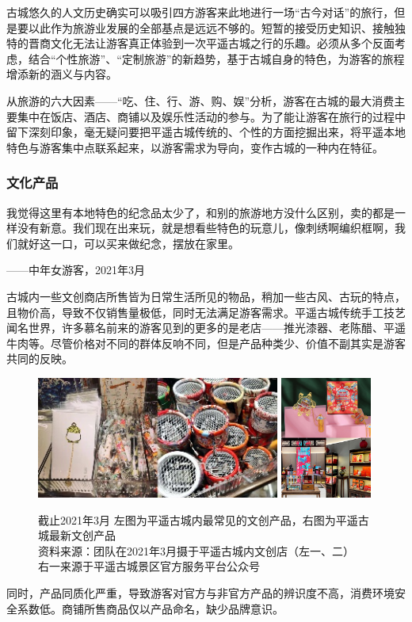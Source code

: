 \documentclass[UTF8]{ctexart}
\begin{document}
        古城悠久的人文历史确实可以吸引四方游客来此地进行一场“古今对话”的旅行，但是要以此作为旅游业发展的全部基点是远远不够的。短暂的接受历史知识、接触独特的晋商文化无法让游客真正体验到一次平遥古城之行的乐趣。必须从多个反面考虑，结合“个性旅游”、“定制旅游”的新趋势，基于古城自身的特色，为游客的旅程增添新的涵义与内容。

        从旅游的六大因素——“吃、住、行、游、购、娱”分析，游客在古城的最大消费主要集中在饭店、酒店、商铺以及娱乐性活动的参与。为了能让游客在旅行的过程中留下深刻印象，毫无疑问要把平遥古城传统的、个性的方面挖掘出来，将平遥本地特色与游客集中点联系起来，以游客需求为导向，变作古城的一种内在特征。

        \subsubsection{文化产品}
        我觉得这里有本地特色的纪念品太少了，和别的旅游地方没什么区别，卖的都是一样没有新意。我们现在出来玩，就是想看些特色的玩意儿，像刺绣啊编织框啊，我们就好这一口，可以买来做纪念，摆放在家里。
        
        \begin{flushright}
            ——中年女游客，2021年3月
        \end{flushright}

        古城内一些文创商店所售皆为日常生活所见的物品，稍加一些古风、古玩的特点，且物价高，导致不仅销售量极低，同时无法满足游客需求。平遥古城传统手工技艺闻名世界，许多慕名前来的游客见到的更多的是老店——推光漆器、老陈醋、平遥牛肉等。尽管价格对不同的群体反响不同，但是产品种类少、价值不副其实是游客共同的反映。
    \begin{figure}[H]
        \centering
        \includegraphics[width=8cm]{文创1.jpeg}
        \includegraphics[width=3cm]{文创拼图.jpg}
        \caption[plain]{截止2021年3月 左图为平遥古城内最常见的文创产品，右图为平遥古城最新文创产品\\资料来源：团队在2021年3月摄于平遥古城内文创店（左一、二）\\右一来源于平遥古城景区官方服务平台公众号}

    \end{figure}
    同时，产品同质化严重，导致游客对官方与非官方产品的辨识度不高，消费环境安全系数低。商铺所售商品仅以产品命名，缺少品牌意识。
    \\\hspace{\fill}\\
    
\end{document}

